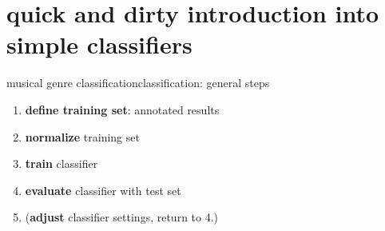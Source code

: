     \section[classifiers]{quick and dirty introduction into simple classifiers}
        \begin{frame}{musical genre classification}{classification: general steps}
            \begin{enumerate}
                \item	\textbf{define training set}: annotated results
                \smallskip
                \item<2->	\textbf{normalize} training set
                \smallskip
                \item<3->	\textbf{train} classifier
                \smallskip
                \item<4->	\textbf{evaluate} classifier with test set
                \smallskip
                \item<5->	(\textbf{adjust} classifier settings, return to 4.)
            \end{enumerate}
        \end{frame}
